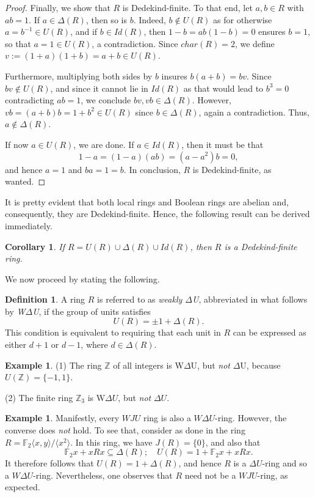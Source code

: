 \documentclass[12pt]{amsart}
\newtheorem{corollary}[theorem]{Corollary}
\theoremstyle{definition}
\newtheorem{example}[theorem]{Example}
\newtheorem{definition}[theorem]{Definition}
\begin{document}
\begin{proof}
Finally, we show that $R$ is Dedekind-finite. To that end, let $a, b \in R$ with $ab = 1$. If $a \in \Delta(R)$, then so is $b$. Indeed, $b \not\in U(R)$ as for otherwise $a = b^{-1} \in U(R)$, and if $b \in Id(R)$, then $1 - b = ab(1 - b) = 0$ ensures $b = 1$, so that $a = 1 \in U(R)$, a contradiction. Since $char(R) = 2$, we define $v := (1 + a)(1 + b) = a + b \in U(R)$.
	
Furthermore, multiplying both sides by $b$ insures $b(a + b) = bv$. Since $bv \not\in U(R)$, and since it cannot lie in $Id(R)$ as that would lead to $b^3 = 0$ contradicting $ab = 1$, we conclude $bv, vb \in \Delta(R)$. However, $vb = (a + b)b = 1 + b^2 \in U(R)$ since $b \in \Delta(R)$, again a contradiction. Thus, $a \not\in \Delta(R)$.
	
If now $a \in U(R)$, we are done. If $a \in Id(R)$, then it must be that $$1 - a = (1 - a)(ab) = (a - a^2)b = 0,$$ and hence $a = 1$ and $ba = 1 = b$. In conclusion, $R$ is Dedekind-finite, as wanted.
\end{proof}

It is pretty evident that both local rings and Boolean rings are abelian and, consequently, they are Dedekind-finite. Hence, the following result can be derived immediately.

\begin{corollary}
If \( R = U(R) \cup \Delta(R) \cup Id(R) \), then $R$ is a Dedekind-finite ring.
\end{corollary}

We now proceed by stating the following.

\begin{definition}
A ring \( R \) is referred to as {\it weakly $\Delta$U}, abbreviated in what follows by {\it W$\Delta$U}, if the group of units satisfies
$$
U(R) = \pm1 + \Delta(R).
$$
This condition is equivalent to requiring that each unit in \( R \) can be expressed as either \( d + 1 \) or \( d - 1 \), where \( d \in \Delta(R) \).	
\end{definition}

\begin{example}
(1) The ring \( \mathbb{Z} \) of all integers is W$\Delta$U, but {\it not} $\Delta$U, because
$
U(\mathbb{Z}) = \{-1, 1\}.
$

(2) The finite ring $\mathbb{Z}_3$ is W$\Delta U$, but {\it not} $\Delta U$.
\end{example}

\begin{example}
Manifestly, every \( WJU \) ring is also a \( W\Delta U \)-ring. However, the converse does {\it not} hold. To see that, consider as done in \cite{12} the ring
$
R = \mathbb{F}_2\langle x, y \rangle / \langle x^2 \rangle.
$
In this ring, we have \( J(R) = \{0\} \), and also that
\[
\mathbb{F}_2 x + xRx \subseteq \Delta(R); \quad U(R) = 1 + \mathbb{F}_2 x + xRx.
\]
It therefore follows that \( U(R) = 1 + \Delta(R) \), and hence \( R \) is a \( \Delta U \)-ring and so a $W\Delta U$-ring. Nevertheless, one observes that \( R \) need not be a \(WJU \)-ring, as expected.
\end{example}
\end{document}
